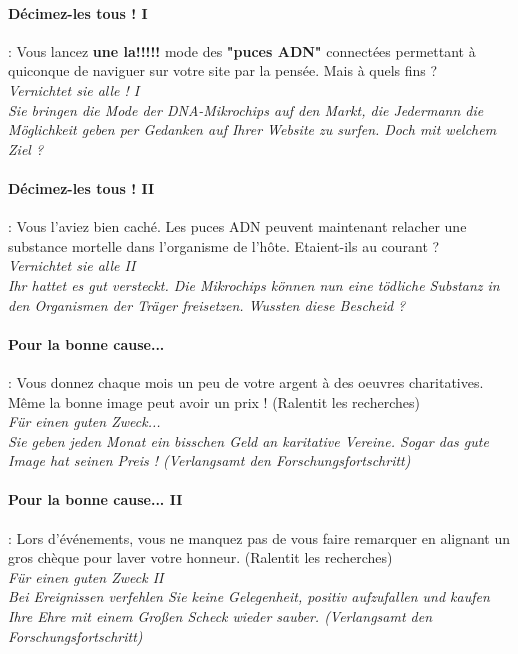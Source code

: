 \documentclass[10pt,a4paper]{article}
\begin{document}
\paragraph{Décimez-les tous ! I} : Vous lancez \textbf{une la!!!!!} mode des \textbf{"puces ADN"} connectées permettant à quiconque de naviguer sur votre site par la pensée. Mais à quels fins ?\\
\textit{Vernichtet sie alle ! I}\\
\textit{Sie bringen die Mode der DNA-Mikrochips auf den Markt, die Jedermann die Möglichkeit geben per Gedanken auf Ihrer Website zu surfen. Doch mit welchem Ziel ?}


\paragraph{Décimez-les tous ! II} : Vous l'aviez bien caché. Les puces ADN peuvent maintenant relacher une substance mortelle dans l'organisme de l'hôte. Etaient-ils au courant ?\\
\textit{Vernichtet sie alle II}\\
\textit{Ihr hattet es gut versteckt. Die Mikrochips können nun eine tödliche Substanz in den Organismen der Träger freisetzen. Wussten diese Bescheid ?}


\paragraph{Pour la bonne cause...} : Vous donnez chaque mois un peu de votre argent à des oeuvres charitatives. Même la bonne image peut avoir un prix ! (Ralentit les recherches)\\
\textit{Für einen guten Zweck...}\\
\textit{Sie geben jeden Monat ein bisschen Geld an karitative Vereine. Sogar das gute Image hat seinen Preis ! (Verlangsamt den Forschungsfortschritt)}


\paragraph{Pour la bonne cause... II} : Lors d'événements, vous ne manquez pas de vous faire remarquer en alignant un gros chèque pour laver votre honneur. (Ralentit les recherches)\\
\textit{Für einen guten Zweck II}\\
\textit{Bei Ereignissen verfehlen Sie keine Gelegenheit, positiv aufzufallen und kaufen Ihre Ehre mit einem Großen Scheck wieder sauber. (Verlangsamt den Forschungsfortschritt)}
\end{document}
